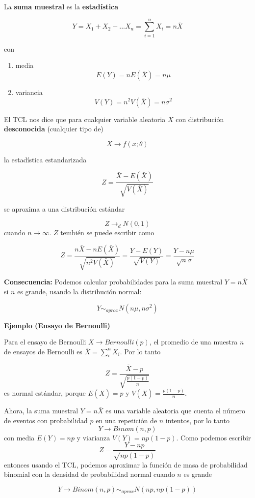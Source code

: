 \documentclass[
]{book}
\providecommand{\tightlist}{%
  \setlength{\itemsep}{0pt}\setlength{\parskip}{0pt}}
\begin{document}
La \textbf{suma muestral} es la \textbf{estadística}

\[Y=X_1+X_2+...X_n=\sum_{i=1}^n X_i=n \bar{X}\]

con

\begin{enumerate}
\def\labelenumi{\arabic{enumi})}
\tightlist
\item
  media \[E(Y)=nE(\bar{X})=n\mu\]
\item
  variancia \[V(Y)=n^2V(\bar{X})=n\sigma^2\]
\end{enumerate}

El TCL nos dice que para cualquier variable aleatoria \(X\) con distribución \textbf{desconocida} (cualquier tipo de)

\[X \rightarrow f(x; \theta)\]

la estadística estandarizada

\[Z=\frac{\bar{X}-E(\bar{X})}{\sqrt{V(\bar{X})}}\]

se aproxima a una distribución estándar

\[Z \rightarrow_d N(0,1)\] cuando \(n\rightarrow \infty\). \(Z\) tembién se puede escribir como

\[Z=\frac{n\bar{X}-nE(\bar{X})}{\sqrt{n^2V(\bar{X})}}=\frac{Y-E(Y)}{\sqrt{V(Y)}}=\frac{Y-n\mu}{\sqrt{n}\sigma}\]

\textbf{Consecuencia:} Podemos calcular probabilidades para la suma muestral \(Y=n\bar{X}\) si \(n\) es grande, usando la distribución normal:

\[Y \sim_{aprox}  N(n\mu, n\sigma^2)\]

\textbf{Ejemplo (Ensayo de Bernoulli)}

Para el ensayo de Bernoulli \(X \rightarrow Bernoulli(p)\), el promedio de una muestra \(n\) de ensayos de Bernoulli es \(\bar{X}=\sum_i^n X_i\). Por lo tanto

\[Z=\frac{\bar{X}-p}{\sqrt{\frac{p(1-p)}{n}}}\]
es normal estándar, porque \(E(\bar{X})=p\) y \(V(\bar{X})=\frac{p(1-p)}{n}\).

Ahora, la suma muestral \(Y=n\bar{X}\) es una variable aleatoria que cuenta el número de eventos con probabilidad \(p\) en una repetición de \(n\) intentos, por lo tanto
\[Y \rightarrow Binom(n, p)\]
con media \(E(Y)=np\) y viarianza \(V(Y)=np(1-p)\). Como podemos escribir
\[Z=\frac{Y-np}{\sqrt{np(1-p)}}\]
entonces usando el TCL, podemos aproximar la función de masa de probabilidad binomial con la densidad de probabilidad normal cuando \(n\) es grande

\[Y \rightarrow Binom(n, p) \sim_{aprox} N(np, np(1-p))\]
\end{document}
